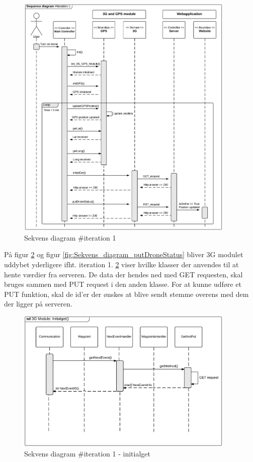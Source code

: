 \begin{figure}[H]
	\centering
	\includegraphics[width=0.93\textwidth]{Billeder/sekvens/sekvens_iteration1}
	\caption{Sekvens diagram \#iteration 1}
	\label{fig:Sekvens_diagram_iteration1}
\end{figure}
\newpage

På figur \ref{fig:Sekvens_diagram_initialget} og figur \ref{fig:Sekvens_diagram_putDroneStatus} bliver 3G modulet uddybet yderligere ifht. iteration 1.
\ref{fig:Sekvens_diagram_initialget} viser hvilke klasser der anvendes til at hente værdier fra serveren. De data der hendes ned med GET requesten, skal bruges sammen med PUT request i den anden klasse. For at kunne udføre et PUT funktion, skal de id'er der ønskes at blive sendt stemme overens med dem der ligger på serveren.

\begin{figure}[H]
	\centering
	\includegraphics[width=0.93\textwidth]{Billeder/sekvens/sekvens_iteration1_initialget}
	\caption{Sekvens diagram \#iteration 1 - initialget}
	\label{fig:Sekvens_diagram_initialget}
\end{figure}

